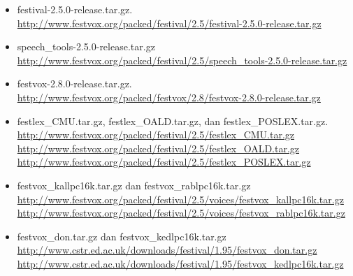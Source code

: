 \documentclass[12pt,]{article}
\begin{document}
	\begin{itemize}
		\item festival-2.5.0-release.tar.gz.\\
		\url{http://www.festvox.org/packed/festival/2.5/festival-2.5.0-release.tar.gz}
		
		\item speech\_tools-2.5.0-release.tar.gz \\
		\url{http://www.festvox.org/packed/festival/2.5/speech_tools-2.5.0-release.tar.gz}
		
		\item festvox-2.8.0-release.tar.gz.\\
		\url{http://www.festvox.org/packed/festvox/2.8/festvox-2.8.0-release.tar.gz}
		
		\item festlex\_CMU.tar.gz, festlex\_OALD.tar.gz, dan festlex\_POSLEX.tar.gz. \\
		\url{http://www.festvox.org/packed/festival/2.5/festlex_CMU.tar.gz}\\
		\url{http://www.festvox.org/packed/festival/2.5/festlex_OALD.tar.gz}\\
		\url{http://www.festvox.org/packed/festival/2.5/festlex_POSLEX.tar.gz}
		
		\item festvox\_kallpc16k.tar.gz dan festvox\_rablpc16k.tar.gz \\
		\url{http://www.festvox.org/packed/festival/2.5/voices/festvox_kallpc16k.tar.gz}\\
		\url{http://www.festvox.org/packed/festival/2.5/voices/festvox_rablpc16k.tar.gz}
		
		\item festvox\_don.tar.gz dan  festvox\_kedlpc16k.tar.gz\\
		\url{http://www.cstr.ed.ac.uk/downloads/festival/1.95/festvox_don.tar.gz} \\
		\url{http://www.cstr.ed.ac.uk/downloads/festival/1.95/festvox_kedlpc16k.tar.gz}
		

\end{itemize}
\end{document}
